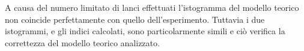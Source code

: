 A causa del numero limitato di lanci effettuati l'istogramma del modello teorico non coincide perfettamente con quello dell'esperimento. Tuttavia i due istogrammi, e gli indici calcolati, sono particolarmente simili e ciò verifica la correttezza del modello teorico analizzato.